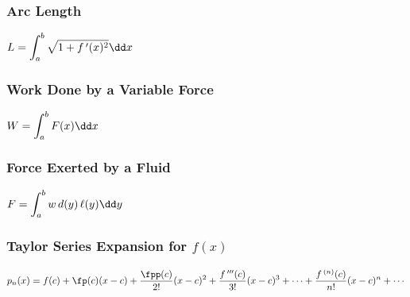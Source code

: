 \subsubsection*{Arc Length}

\noindent
$\ds L = \int_a^b{\sqrt{1+ f\,'(x)^2}}\dd x$\bigskip\bigskip


\noindent
\begin{minipage}[t]{.5\linewidth}
  \subsubsection*{Work Done by a Variable Force}
  $\ds W = \int_a^b{F(x)}\dd x$
\end{minipage}%
\begin{minipage}[t]{.5\linewidth}
 \subsubsection*{Force Exerted by a Fluid}
 $\ds F = \int_a^b{w\,d(y)\,\ell(y)}\dd y$
\end{minipage}\bigskip

\subsubsection*{Taylor Series Expansion for $f(x)$}
\noindent$\ds p_n(x) = f(c) + \fp(c)(x-c) + \frac{\fpp(c)}{2!}(x-c)^2 + \frac{f\,'''(c)}{3!}(x-c)^3 + \dotsb + \frac{f\,^{(n)}(c)}{n!}(x-c)^n + \dotsb $
\bigskip\bigskip


